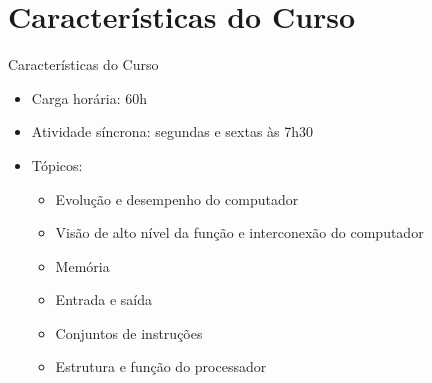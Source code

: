    \section[ slide = true]{Características do Curso}
      \begin{slide}[toc=]{Características do Curso}
         \begin{itemize}
            \item Carga horária: 60h
            \item Atividade síncrona: segundas e sextas às 7h30 
            \item Tópicos:
            \begin{itemize}
               \item Evolução e desempenho do computador
               \item Visão de alto nível da função e interconexão do computador
               \item Memória
               \item Entrada e saída
               \item Conjuntos de instruções
               \item Estrutura e função do processador
            \end{itemize}
         \end{itemize}         
      \end{slide}
      
